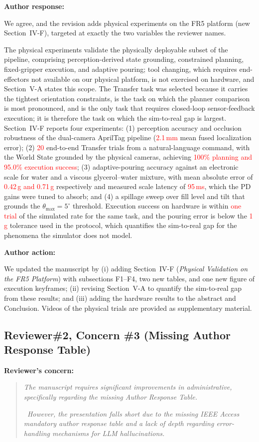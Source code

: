 \documentclass[11pt]{article}
\newcommand{\nd}[1]{\textcolor{red}{#1}}
\newif\ifshowstatus
\newcommand{\statusline}[2]{\ifshowstatus\par\noindent\textcolor{status#1}{\textbf{Status: \MakeUppercase{#1}.} #2}\par\smallskip\fi}
\newenvironment{concern}[3][pending]{\subsection*{\ifshowstatus\textcolor{status#1}{#2}\else#2\fi}\statusline{#1}{#3}\textbf{Reviewer's concern:}\begin{quote}\itshape}{\end{quote}}
\newenvironment{response}{\textbf{Author response:}\par\smallskip}{\par\medskip}
\newenvironment{action}{\textbf{Author action:}\par\smallskip}{\par\bigskip\noindent\hrulefill\par\bigskip}
\begin{document}
\begin{response}
We agree, and the revision adds physical experiments on the FR5 platform (new Section~IV-F), targeted at exactly the two variables the reviewer names.

The physical experiments validate the physically deployable subset of the pipeline, comprising perception-derived state grounding, constrained planning, fixed-gripper execution, and adaptive pouring; tool changing, which requires end-effectors not available on our physical platform, is not exercised on hardware, and Section~V-A states this scope.
The Transfer task was selected because it carries the tightest orientation constraints, is the task on which the planner comparison is most pronounced, and is the only task that requires closed-loop sensor-feedback execution; it is therefore the task on which the sim-to-real gap is largest.
Section~IV-F reports four experiments:
(1) perception accuracy and occlusion robustness of the dual-camera AprilTag pipeline (\nd{2.1\,mm} mean fused localization error);
(2) \nd{20} end-to-end Transfer trials from a natural-language command, with the World State grounded by the physical cameras, achieving \nd{100\% planning and 95.0\% execution success};
(3) adaptive-pouring accuracy against an electronic scale for water and a viscous glycerol--water mixture, with mean absolute error of \nd{0.42\,g and 0.71\,g} respectively and measured scale latency of \nd{95\,ms}, which the PD gains were tuned to absorb; and
(4) a spillage sweep over fill level and tilt that grounds the $\theta_{\max}=5^\circ$ threshold.
Execution success on hardware is within \nd{one trial} of the simulated rate for the same task, and the pouring error is below the \nd{1\,g} tolerance used in the protocol, which quantifies the sim-to-real gap for the phenomena the simulator does not model.
\end{response}

\begin{action}
We updated the manuscript by
(i) adding Section~IV-F (\emph{Physical Validation on the FR5 Platform}) with subsections F1--F4, two new tables, and one new figure of execution keyframes;
(ii) revising Section~V-A to quantify the sim-to-real gap from these results;
and (iii) adding the hardware results to the abstract and Conclusion.
Videos of the physical trials are provided as supplementary material.
\end{action}

\begin{concern}[complete]{Reviewer\#2, Concern \#3 (Missing Author Response Table)}{Administrative; this document is the response.}
The manuscript requires significant improvements in administrative, specifically regarding the missing Author Response Table.

\itshape\
However, the presentation falls short due to the missing IEEE Access mandatory author response table and a lack of depth regarding error-handling mechanisms for LLM hallucinations.
\end{concern}
\end{document}
